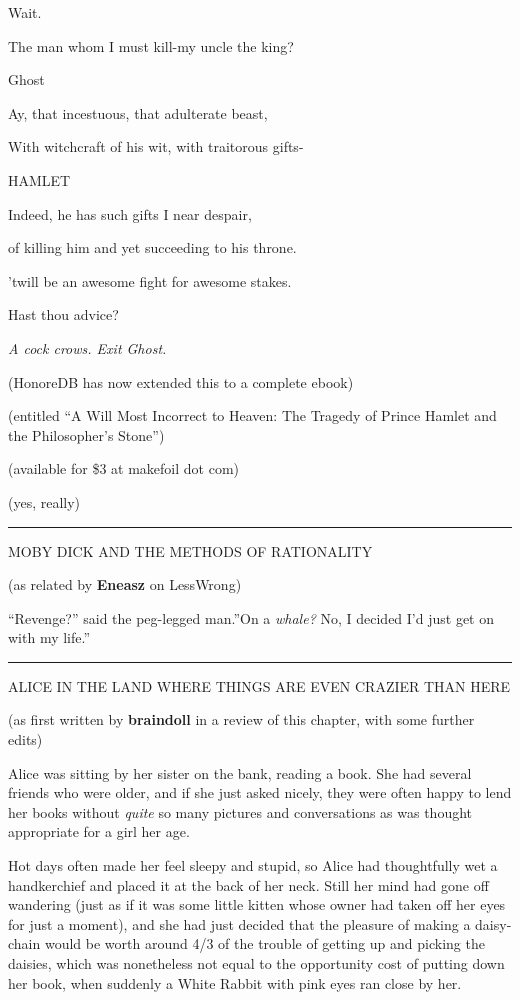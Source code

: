 Wait.

The man whom I must kill-my uncle the king?

Ghost

Ay, that incestuous, that adulterate beast,

With witchcraft of his wit, with traitorous gifts-

HAMLET

Indeed, he has such gifts I near despair,

of killing him and yet succeeding to his throne.

'twill be an awesome fight for awesome stakes.

Hast thou advice?

\emph{A cock crows. Exit Ghost.}

(HonoreDB has now extended this to a complete ebook)

(entitled ``A Will Most Incorrect to Heaven: The Tragedy of Prince
Hamlet and the Philosopher's Stone'')

(available for \$3 at makefoil dot com)

(yes, really)

\begin{center}\rule{3in}{0.4pt}\end{center}

MOBY DICK AND THE METHODS OF RATIONALITY

(as related by \textbf{Eneasz} on LessWrong)

``Revenge?'' said the peg-legged man.''On a \emph{whale?} No, I decided
I'd just get on with my life.''

\begin{center}\rule{3in}{0.4pt}\end{center}

ALICE IN THE LAND WHERE THINGS ARE EVEN CRAZIER THAN HERE

(as first written by \textbf{braindoll} in a review of this chapter,
with some further edits)

Alice was sitting by her sister on the bank, reading a book. She had
several friends who were older, and if she just asked nicely, they were
often happy to lend her books without \emph{quite} so many pictures and
conversations as was thought appropriate for a girl her age.

Hot days often made her feel sleepy and stupid, so Alice had
thoughtfully wet a handkerchief and placed it at the back of her neck.
Still her mind had gone off wandering (just as if it was some little
kitten whose owner had taken off her eyes for just a moment), and she
had just decided that the pleasure of making a daisy-chain would be
worth around 4/3 of the trouble of getting up and picking the daisies,
which was nonetheless not equal to the opportunity cost of putting down
her book, when suddenly a White Rabbit with pink eyes ran close by her.

